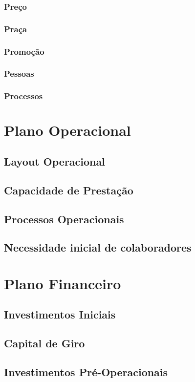 \documentclass[a4paper, 12pt]{paper}
\begin{document}
\subsubsection{Preço}
\subsubsection{Praça}
\subsubsection{Promoção}
\subsubsection{Pessoas}
\subsubsection{Processos}
\newpage
\section{Plano Operacional}
\subsection{Layout Operacional}
\subsection{Capacidade de Prestação}
\subsection{Processos Operacionais}
\subsection{Necessidade inicial de colaboradores}
\newpage
\section{Plano Financeiro}
\subsection{Investimentos Iniciais}
\subsection{Capital de Giro}
\subsection{Investimentos Pré-Operacionais}
\end{document}
